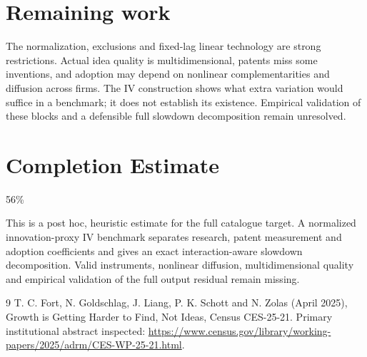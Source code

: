 \documentclass[11pt]{article}
\begin{document}
\section*{Remaining work}
The normalization, exclusions and fixed-lag linear technology are strong restrictions. Actual idea quality is multidimensional, patents miss some inventions, and adoption may depend on nonlinear complementarities and diffusion across firms. The IV construction shows what extra variation would suffice in a benchmark; it does not establish its existence. Empirical validation of these blocks and a defensible full slowdown decomposition remain unresolved.

\section{Completion Estimate}
56\%

This is a post hoc, heuristic estimate for the full catalogue target.
A normalized innovation-proxy IV benchmark separates research, patent measurement and adoption coefficients and gives an exact interaction-aware slowdown decomposition. Valid instruments, nonlinear diffusion, multidimensional quality and empirical validation of the full output residual remain missing.

\begin{thebibliography}{9}
 T. C. Fort, N. Goldschlag, J. Liang, P. K. Schott and N. Zolas (April 2025), Growth is Getting Harder to Find, Not Ideas, Census CES-25-21. Primary institutional abstract inspected:
\url{https://www.census.gov/library/working-papers/2025/adrm/CES-WP-25-21.html}.
\end{thebibliography}
\end{document}
